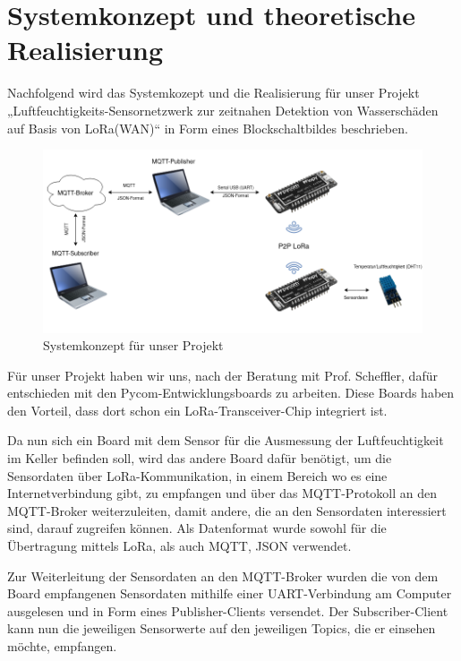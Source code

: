 \newpage


\section{Systemkonzept und theoretische Realisierung} \label{Systemkonzept und theoretische Realisierung}

Nachfolgend wird das Systemkozept und die Realisierung für unser Projekt „Luftfeuchtigkeits-Sensornetzwerk zur zeitnahen Detektion von Wasserschäden auf Basis von LoRa(WAN)“ in Form eines Blockschaltbildes beschrieben. 

\begin{figure}[h]
 \centering
 \includegraphics[width=1.1\textwidth]{pictures/Blockschaltbild_ProNeSy}
 \caption[Systemkonzept für unser Projekt]{Systemkonzept für unser Projekt}
 \label{fig:systemkonzept}
\end{figure}

Für unser Projekt haben wir uns, nach der Beratung mit Prof. Scheffler, dafür entschieden mit den Pycom-Entwicklungsboards zu arbeiten. Diese Boards haben den Vorteil, dass dort schon ein LoRa-Transceiver-Chip integriert ist. 

Da nun sich ein Board mit dem Sensor für die Ausmessung der Luftfeuchtigkeit im Keller befinden soll, wird das andere Board dafür benötigt, um die Sensordaten über LoRa-Kommunikation, in einem Bereich wo es eine Internetverbindung gibt, zu empfangen und über das MQTT-Protokoll an den MQTT-Broker weiterzuleiten, damit andere, die an den Sensordaten interessiert sind, darauf zugreifen können. Als Datenformat wurde sowohl für die Übertragung mittels LoRa, als auch MQTT, JSON verwendet.

Zur Weiterleitung der Sensordaten an den MQTT-Broker wurden die von dem Board empfangenen Sensordaten mithilfe einer UART-Verbindung am Computer ausgelesen und in Form eines Publisher-Clients versendet. Der Subscriber-Client kann nun die jeweiligen Sensorwerte auf den jeweiligen Topics, die er einsehen möchte, empfangen.\\\\

